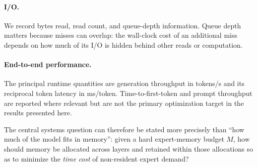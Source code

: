 \paragraph{I/O.}
We record bytes read, read count, and queue-depth information. Queue depth matters because misses can overlap: the wall-clock cost of an additional miss depends on how much of its I/O is hidden behind other reads or computation.

\paragraph{End-to-end performance.}
The principal runtime quantities are generation throughput in tokens/s and its reciprocal token latency in ms/token. Time-to-first-token and prompt throughput are reported where relevant but are not the primary optimization target in the results presented here.

The central systems question can therefore be stated more precisely than ``how much of the model fits in memory'': given a hard expert-memory budget $M$, how should memory be allocated across layers and retained within those allocations so as to minimize the \emph{time cost} of non-resident expert demand?
